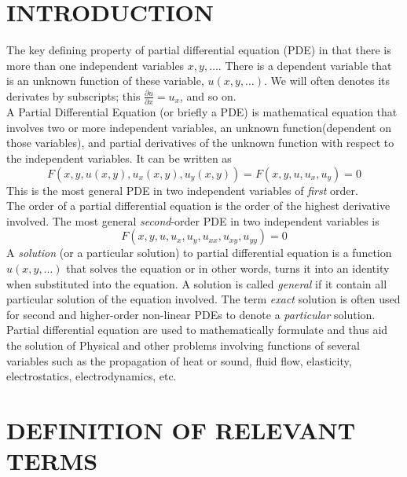 \documentclass[11pt]{report}
\newcommand{\dsp}{\displaystyle}
\begin{document}
	\section{INTRODUCTION}
	The key defining property of partial differential equation (PDE) in that there is more than one independent variables $x,y,\ldots$. There is a dependent variable that is an unknown function of these variable, $u(x,y,\ldots)$. We will often denotes its derivates by subscripts; this $\dsp\frac{\partial u}{\partial x} = u_x$, and so on.\\
	
	A Partial Differential Equation (or briefly a PDE) is  mathematical equation that involves two or more independent variables, an unknown function(dependent on those variables), and partial derivatives of the unknown function with respect to the independent variables. It can be written as
	\begin{equation}
		F(x,y,u(x,y), u_x(x,y), u_y(x,y)) = F(x,y,u,u_x,u_y) = 0
	\end{equation}
	This is the most general PDE in two independent variables of \textit{first} order.\\
	
	The order of a partial differential equation is the order of the highest derivative involved. The most general \textit{second}-order PDE in two independent variables is
	\begin{equation}
		F(x,y,u,u_x,u_y,u_{xx}, u_{xy}, u_{yy})=0
	\end{equation}
	A \textit{solution} (or a particular solution) to partial differential equation is a function $u(x,y,\ldots)$ that solves the equation or in other words, turns it into an identity when substituted into the equation. A solution is called \textit{general} if it contain all particular solution of the equation involved. The term \textit{exact} solution is often used for second and higher-order non-linear PDEs to denote a \textit{particular} solution.\\
	
	Partial differential equation are used to mathematically formulate and thus aid the solution of Physical and other problems involving functions of several variables such as the propagation of heat or sound, fluid flow, elasticity, electrostatics, electrodynamics, etc.
	
	
	
	\section{DEFINITION OF RELEVANT TERMS}
\end{document}
